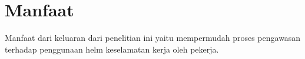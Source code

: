 \section{Manfaat}
\label{sec:manfaat}

Manfaat dari keluaran dari penelitian ini yaitu mempermudah proses pengawasan terhadap penggunaan helm keselamatan kerja oleh pekerja.



















